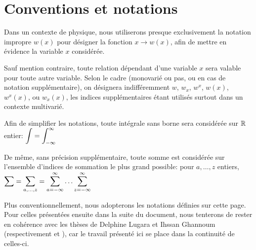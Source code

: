 \section*{Conventions et notations}


  Dans un contexte de physique, nous utiliserons presque exclusivement la notation impropre $w(x)$
  pour désigner la fonction $x\rightarrow w(x)$, afin de mettre en évidence la variable $x$ considérée.
  
  Sauf mention contraire, toute relation dépendant d'une variable $x$
  sera valable pour toute autre variable.  
  Selon le cadre (monovarié ou pas, ou en cas de notation supplémentaire), on désignera indifféremment
  $w$, $w_x$, $w^x$, $w(x)$, $w^x(x)$, ou $w_x(x)$, les indices supplémentaires étant utilisés
  surtout dans un contexte multivarié.

  Afin de simplifier les notations, toute intégrale sans borne sera considérée sur $\mathbb{R}$ entier:
  $\displaystyle\int=\displaystyle\int_{-\infty}^{\infty}$
  
  De même, sans précision supplémentaire, toute somme est considérée sur l'ensemble d'indices de sommation
  le plus grand possible:
  pour $a,\dots,z$ entiers, $\displaystyle\sum=\displaystyle\sum_{a,\dots,z}=\displaystyle\sum_{a=-\infty}^{\infty}\dots\displaystyle\sum_{z=-\infty}^{\infty}$

  Plus conventionnellement, nous adopterons les notations définies sur cette page.
  Pour celles présentées ensuite dans la suite du document, nous tenterons de rester en cohérence
  avec les thèses de Delphine Lugara et Ihssan Ghannoum (respectivement \cite{TheseLugara} et \cite{TheseGhannoum}),
  car le travail présenté ici se place dans la continuité de celles-ci.


